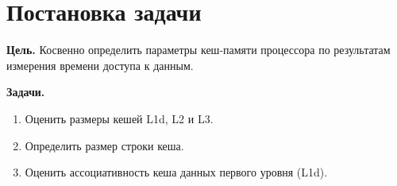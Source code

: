\section*{Постановка задачи}

\textbf{Цель.} Косвенно определить параметры кеш-памяти процессора 
по результатам измерения времени доступа к данным.

\textbf{Задачи.}
\begin{enumerate}
    \item Оценить размеры кешей L1d, L2 и L3.
    \item Определить размер строки кеша.
    \item Оценить ассоциативность кеша данных первого уровня (L1d).
\end{enumerate}
